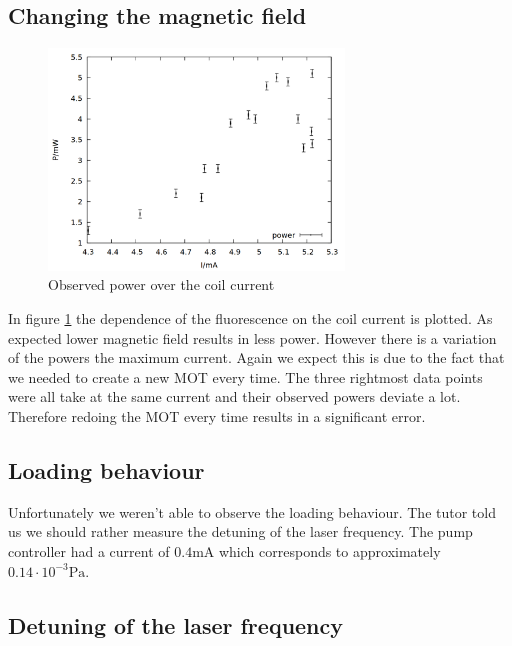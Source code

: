 \subsection{Changing the magnetic field}

\begin{figure}
\centering
\includegraphics[width=0.7\textwidth]{data/bfeld.png}
\caption{Observed power over the coil current}
\label{fig:bfeld}
\end{figure}

In figure \ref{fig:bfeld} the dependence of the fluorescence on the coil current is plotted. As expected lower magnetic field results in less power. However there is a variation of the powers the maximum current. Again we expect this is due to the fact that we needed to create a new MOT every time. The three rightmost data points were all take at the same current and their observed powers deviate a lot. Therefore redoing the MOT every time results in a significant error.  

\subsection{Loading behaviour}
Unfortunately we weren't able to observe the loading behaviour. The tutor told us we should rather measure the detuning of the laser frequency. The pump controller had a current of $0.4 \si{\milli\ampere}$ which corresponds to approximately $0.14 \cdot 10^{-3} \si{\pascal}$.

\subsection{Detuning of the laser frequency}

